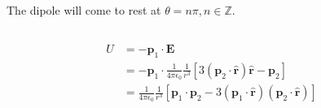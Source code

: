 \documentclass{article}
\renewcommand{\vec}[1]{\boldsymbol{\mathbf{#1}}}
\newcommand{\uvec}[1]{\hat{\vec{#1}}}
\newcommand{\ke}{\frac{1}{4 \pi \epsilon_0}}
\begin{document}
The dipole will come to rest at $\theta = n \pi, n \in \mathbb{Z}$.

\setcounter{subsection}{7}
\subsection{}

\begin{align*}
  U & = -\vec{p}_1 \cdot \vec{E}                                                                                \\
    & = -\vec{p}_1 \cdot \ke \frac{1}{r^3} [3 (\vec{p}_2 \cdot \uvec{r}) \uvec{r} - \vec{p}_2]                  \\
    & = \ke \frac{1}{r^3} [\vec{p}_1 \cdot \vec{p}_2 - 3 (\vec{p}_1 \cdot \uvec{r}) (\vec{p}_2 \cdot \uvec{r})]
\end{align*}

\subsection{}
\end{document}
